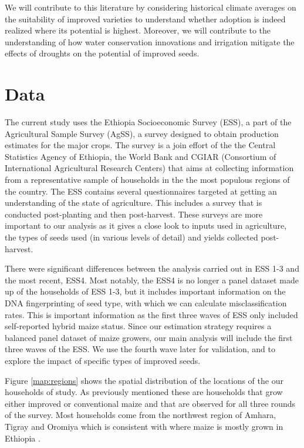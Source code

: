 \documentclass{article}
\begin{document}
We will contribute to this literature by considering historical climate averages on the suitability of improved varieties to understand whether adoption is indeed realized where its potential is highest. Moreover, we will contribute to the understanding of how water conservation innovations and irrigation mitigate the effects of droughts on the potential of improved seeds.



\section{Data}

The current study uses the Ethiopia Socioeconomic Survey (ESS), a part of the Agricultural Sample Survey (AgSS), a survey designed to obtain production estimates for the major crops. The survey is a join effort of the the Central Statistics Agency of Ethiopia, the World Bank and CGIAR (Consortium of International Agricultural Research Centers) \citep{kosmowski2020shining} that aims at collecting information from a representative sample of households in the  the most populous regions of the country. The ESS contains several questionnaires targeted at getting an understanding of the state of agriculture. This includes a survey that is conducted post-planting and then post-harvest. These surveys are more important to our analysis as it gives a close look to inputs used in agriculture, the types of seeds used (in various levels of detail) and yields collected post-harvest.

There were significant differences between the analysis carried out in ESS 1-3 and the most recent, ESS4. Most notably, the ESS4 is no longer a panel dataset made up of the households of ESS 1-3, but it includes important information on the DNA fingerprinting of seed type, with which we can calculate misclassification rates. This is important information as the first three waves of ESS only included self-reported hybrid maize status. Since our estimation strategy requires a balanced panel dataset of maize growers, our main analysis will include the first three waves of the ESS. We use the fourth wave later for validation, and to explore the impact of specific types of improved seeds.

Figure \ref{map:regions} shows the spatial distribution of the locations of the our households of study. As previously mentioned these are households that grow either improved or conventional maize and that are observed for all three rounds of the survey. Most households come from the northwest region of Amhara, Tigray and Oromiya which is consistent with where maize is mostly grown in Ethiopia \citep{Abate2015-rj}.
\end{document}
